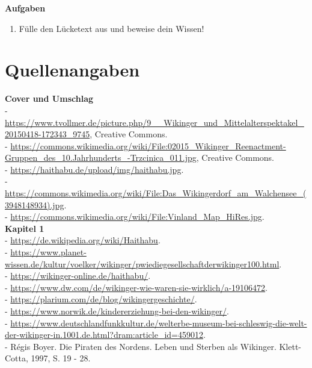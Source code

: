 \documentclass[12pt,a4paper,ngerman,openany]{book}
\newcommand\blankpage{\null \thispagestyle{empty} \addtocounter{page}{-1} \newpage}
\newcommand{\aufgaben}[1]{
  \begin{tcolorbox}
    \textbf{Aufgaben}
    \begin{enumerate}
      #1
    \end{enumerate}
  \end{tcolorbox}
} %
\begin{document}
\aufgaben{
  \item Fülle den Lücketext aus und beweise dein Wissen!
}

\afterpage{\blankpage}

\newpage %
\section{Quellenangaben}
\textbf{Cover und Umschlag}\\
- \url{https://www.tvollmer.de/picture.php/9__Wikinger_und_Mittelalterspektakel_20150418-172343_9745}, Creative Commons.\\
- \url{https://commons.wikimedia.org/wiki/File:02015_Wikinger_Reenactment-Gruppen_des_10.Jahrhunderts_-Trzcinica_011.jpg}, Creative Commons.\\
- \url{https://haithabu.de/upload/img/haithabu.jpg}.\\
- \url{https://commons.wikimedia.org/wiki/File:Das_Wikingerdorf_am_Walchensee_(3948148934).jpg}.\\
- \url{https://commons.wikimedia.org/wiki/File:Vinland_Map_HiRes.jpg}.\\

\textbf{Kapitel 1}\\
- \url{https://de.wikipedia.org/wiki/Haithabu}.\\
- \url{https://www.planet-wissen.de/kultur/voelker/wikinger/pwiediegesellschaftderwikinger100.html}.\\
- \url{https://wikinger-online.de/haithabu/}.\\
- \url{https://www.dw.com/de/wikinger-wie-waren-sie-wirklich/a-19106472}.\\
- \url{https://plarium.com/de/blog/wikingergeschichte/}.\\
- \url{https://www.norwik.de/kindererziehung-bei-den-wikinger/}.\\
- \url{https://www.deutschlandfunkkultur.de/welterbe-museum-bei-schleswig-die-welt-der-wikinger-in.1001.de.html?dram:article_id=459012}.\\
- Régis Boyer. Die Piraten des Nordens. Leben und Sterben als Wikinger. Klett-Cotta, 1997, S. 19 - 28.\\
\end{document}
